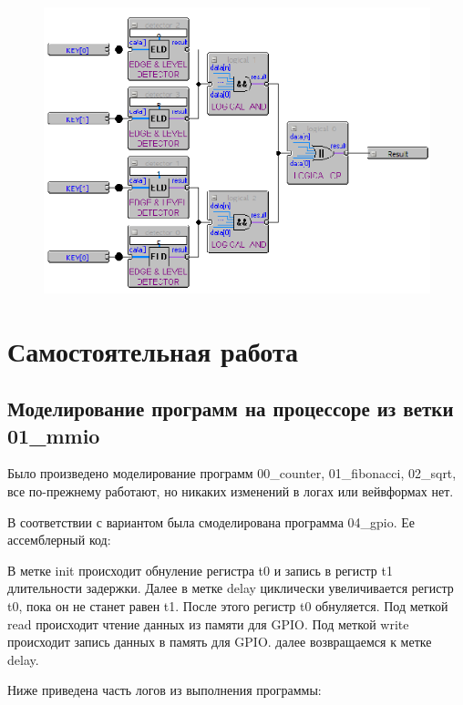 \documentclass[a4paper,14pt]{article}
\begin{document}
	\begin{figure}[H]
		\centering
		\includegraphics[width=0.7\linewidth]{images/advanced_scheme}
		\caption{}
		\label{fig:advancedscheme}
	\end{figure}
	


	
	
	\section{Самостоятельная работа}
	
	

	\subsection{Моделирование программ на процессоре из ветки 01\_mmio}
	
	Было произведено моделирование программ  00\_counter, 01\_fibonacci, 02\_sqrt, все по-прежнему работают, но никаких изменений в логах или вейвформах нет.
	
	В соответствии с вариантом была смоделирована программа 04\_gpio. Ее ассемблерный код:
	
	{\small {}}
	
	В метке init происходит обнуление регистра t0 и запись в регистр t1 длительности задержки.
	Далее в метке delay циклически увеличивается регистр t0, пока он не станет равен t1.
	После этого регистр t0 обнуляется.
	Под меткой read происходит чтение данных из памяти для GPIO.
	Под меткой write происходит запись данных в память для GPIO.
	далее возвращаемся к метке delay.
	
	Ниже приведена часть логов из выполнения программы:
	
	{\small {}}
	
\end{document}
